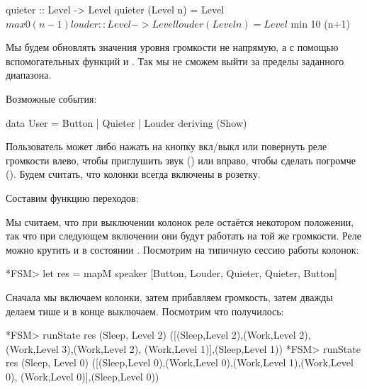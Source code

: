 \begin{code}
quieter :: Level -> Level
quieter (Level n) = Level $ max 0 (n-1)

louder :: Level -> Level
louder (Level n) = Level $ min 10 (n+1)
\end{code}

Мы будем обновлять значения уровня громкости не напрямую, а с помощью
вспомогательных функций  и . Так мы не сможем
выйти за пределы заданного диапазона.

Возможные события:


\begin{code}
data User = Button | Quieter | Louder
    deriving (Show)
\end{code}

Пользователь может либо нажать на кнопку вкл/выкл или повернуть реле
громкости влево, чтобы приглушить звук () или вправо, чтобы
сделать погромче (). Будем считать, что колонки всегда
включены в розетку.

Составим функцию переходов:



Мы считаем, что при выключении колонок реле остаётся некотором
положении, так что при следующем включении они будут работать на той же
громкости. Реле можно крутить и в состоянии . Посмотрим на
типичную сессию работы колонок:


\begin{code}
*FSM> let res = mapM speaker [Button, Louder, Quieter, Quieter, Button] 
\end{code}

Сначала мы включаем колонки, затем прибавляем громкость, затем дважды
делаем тише и в конце выключаем. Посмотрим что получилось:


\begin{code}
*FSM> runState res (Sleep, Level 2)
([(Sleep,Level 2),(Work,Level 2),(Work,Level 3),(Work,Level 2),
 (Work,Level 1)],(Sleep,Level 1))
*FSM> runState res (Sleep, Level 0)
([(Sleep,Level 0),(Work,Level 0),(Work,Level 1),(Work,Level 0),
 (Work,Level 0)],(Sleep,Level 0))
\end{code}

